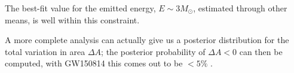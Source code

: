 \documentclass[main.tex]{subfiles}
\begin{document}
The best-fit value for the emitted energy, \(E \sim 3M_{\odot}\), estimated through other means, is well within this constraint.

A more complete analysis can actually give us a posterior distribution for the total variation in area \(\Delta A\); the posterior probability of \(\Delta A < 0\) can then be computed, with GW150814 this comes out to be \(< 5\%\) \cite{isiTestingBlackholeArea2021}.
\end{document}
